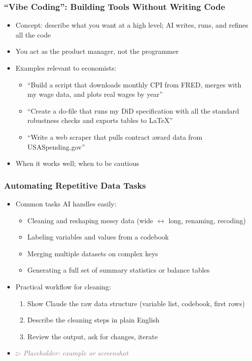 \documentclass[aspectratio=169, 12pt]{beamer}
\begin{document}
\begin{frame}
\frametitle{``Vibe Coding'': Building Tools Without Writing Code}

\begin{itemize}
    \item Concept: describe what you want at a high level; AI writes, runs, and refines all the code
    \item You act as the product manager, not the programmer
    \item Examples relevant to economists:
        \begin{itemize}
            \item[$\circ$] ``Build a script that downloads monthly CPI from FRED, merges with my wage data, and plots real wages by year''
            \item[$\circ$] ``Create a do-file that runs my DiD specification with all the standard robustness checks and exports tables to LaTeX''
            \item[$\circ$] ``Write a web scraper that pulls contract award data from USASpending.gov''
        \end{itemize}
    \item When it works well; when to be cautious
\end{itemize}

\end{frame}


\begin{frame}
\frametitle{Automating Repetitive Data Tasks}

\begin{itemize}
    \item Common tasks AI handles easily:
        \begin{itemize}
            \item[$\circ$] Cleaning and reshaping messy data (wide $\leftrightarrow$ long, renaming, recoding)
            \item[$\circ$] Labeling variables and values from a codebook
            \item[$\circ$] Merging multiple datasets on complex keys
            \item[$\circ$] Generating a full set of summary statistics or balance tables
        \end{itemize}
    \vspace{.05in}
    \item Practical workflow for cleaning:
        \begin{enumerate}
            \item Show Claude the raw data structure (variable list, codebook, first rows)
            \item Describe the cleaning steps in plain English
            \item Review the output, ask for changes, iterate
        \end{enumerate}
    \item \textcolor{gray}{\textit{$\triangleright$ Placeholder: example or screenshot}}
\end{itemize}

\end{frame}
\end{document}
